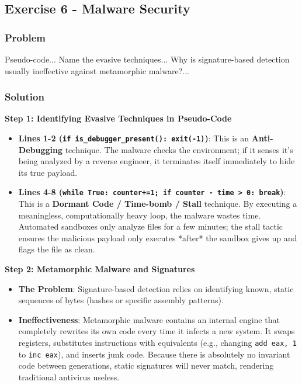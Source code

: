 \documentclass{article}
\begin{document}
\subsection{Exercise 6 - Malware Security}
\subsubsection*{Problem}
Pseudo-code... Name the evasive techniques... Why is signature-based detection usually ineffective against metamorphic malware?...

\subsubsection*{Solution}
\textbf{Step 1: Identifying Evasive Techniques in Pseudo-Code}
\begin{itemize}
    \item \textbf{Lines 1-2 (\texttt{if is\_debugger\_present(): exit(-1)})}: This is an \textbf{Anti-Debugging} technique. The malware checks the environment; if it senses it's being analyzed by a reverse engineer, it terminates itself immediately to hide its true payload.
    \item \textbf{Lines 4-8 (\texttt{while True: counter+=1; if counter - time > 0: break})}: This is a \textbf{Dormant Code / Time-bomb / Stall} technique. By executing a meaningless, computationally heavy loop, the malware wastes time. Automated sandboxes only analyze files for a few minutes; the stall tactic ensures the malicious payload only executes *after* the sandbox gives up and flags the file as clean.

\end{itemize}
\textbf{Step 2: Metamorphic Malware and Signatures}
\begin{itemize}
    \item \textbf{The Problem}: Signature-based detection relies on identifying known, static sequences of bytes (hashes or specific assembly patterns).
    \item \textbf{Ineffectiveness}: Metamorphic malware contains an internal engine that completely rewrites its own code every time it infects a new system. It swaps registers, substitutes instructions with equivalents (e.g., changing \texttt{add eax, 1} to \texttt{inc eax}), and inserts junk code. Because there is absolutely no invariant code between generations, static signatures will never match, rendering traditional antivirus useless.

\end{itemize}
\end{document}
